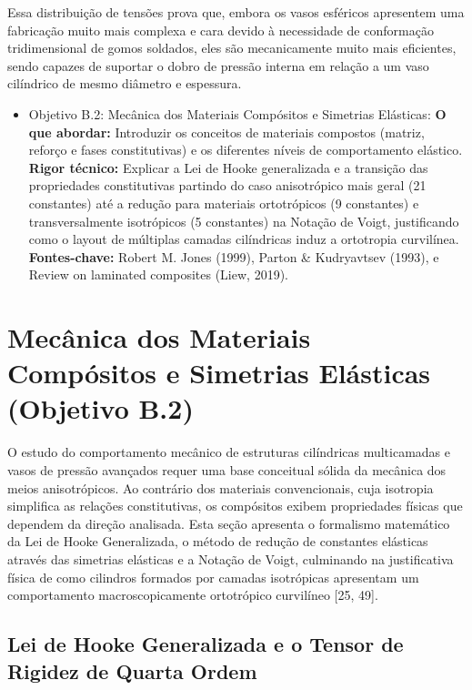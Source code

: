 Essa distribuição de tensões prova que, embora os vasos esféricos apresentem uma fabricação muito mais complexa e cara devido à necessidade de conformação tridimensional de gomos soldados, eles são mecanicamente muito mais eficientes, sendo capazes de suportar o dobro de pressão interna em relação a um vaso cilíndrico de mesmo diâmetro e espessura.




\begin{itemize}
  \item Objetivo B.2: Mecânica dos Materiais Compósitos e Simetrias Elásticas:
    \textbf{ O que abordar:} Introduzir os conceitos de materiais compostos (matriz, reforço e fases constitutivas) e os diferentes níveis de comportamento elástico.
    \textbf{ Rigor técnico:} Explicar a Lei de Hooke generalizada e a transição das propriedades constitutivas partindo do caso anisotrópico mais geral (21 constantes) até a redução para materiais ortotrópicos (9 constantes) e transversalmente isotrópicos (5 constantes) na Notação de Voigt, justificando como o layout de múltiplas camadas cilíndricas induz a ortotropia curvilínea.
    \textbf{ Fontes-chave:} Robert M. Jones (1999), Parton \& Kudryavtsev (1993), e Review on laminated composites (Liew, 2019).
\end{itemize}


\section{Mecânica dos Materiais Compósitos e Simetrias Elásticas (Objetivo B.2)}

O estudo do comportamento mecânico de estruturas cilíndricas multicamadas e vasos de pressão avançados requer uma base conceitual sólida da mecânica dos meios anisotrópicos. Ao contrário dos materiais convencionais, cuja isotropia simplifica as relações constitutivas, os compósitos exibem propriedades físicas que dependem da direção analisada. Esta seção apresenta o formalismo matemático da Lei de Hooke Generalizada, o método de redução de constantes elásticas através das simetrias elásticas e a Notação de Voigt, culminando na justificativa física de como cilindros formados por camadas isotrópicas apresentam um comportamento macroscopicamente ortotrópico curvilíneo [25, 49].

\subsection{Lei de Hooke Generalizada e o Tensor de Rigidez de Quarta Ordem}

